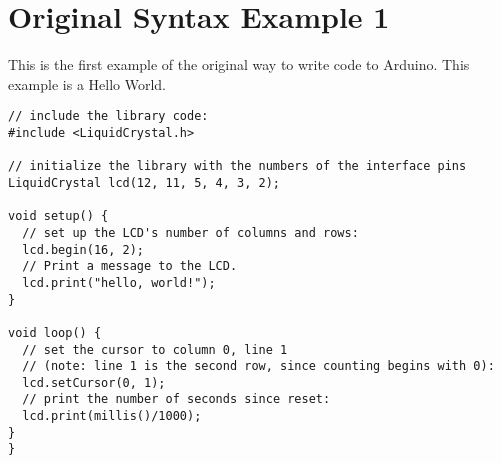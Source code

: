 \section{Original Syntax Example 1}
This is the first example of the original way to write code to Arduino. This example is a Hello World.
\begin{lstlisting}[caption=This is the first original Arduino example \cite{arduino_hello_world_example}, label=lst:first_syntax_example]
// include the library code:
#include <LiquidCrystal.h>

// initialize the library with the numbers of the interface pins
LiquidCrystal lcd(12, 11, 5, 4, 3, 2);

void setup() {
  // set up the LCD's number of columns and rows: 
  lcd.begin(16, 2);
  // Print a message to the LCD.
  lcd.print("hello, world!");
}

void loop() {
  // set the cursor to column 0, line 1
  // (note: line 1 is the second row, since counting begins with 0):
  lcd.setCursor(0, 1);
  // print the number of seconds since reset:
  lcd.print(millis()/1000);
}
}
\end{lstlisting}
